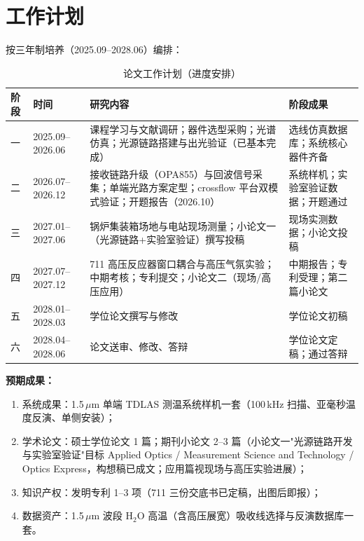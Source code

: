 \documentclass[12pt,a4paper]{article}
\begin{document}
\section{工作计划}

按三年制培养（2025.09--2028.06）编排：

\begin{table}[htbp]
  \centering
  \caption{论文工作计划（进度安排）}
  \begin{tabular}{p{1.0cm}p{2.9cm}p{5.2cm}p{4.2cm}}
    \toprule
    阶段 & 时间 & 研究内容 & 阶段成果 \\
    \midrule
    一 & 2025.09--2026.06 & 课程学习与文献调研；器件选型采购；光谱仿真；光源链路搭建与出光验证（已基本完成） & 选线仿真数据库；系统核心器件齐备 \\
    二 & 2026.07--2026.12 & 接收链路升级（OPA855）与回波信号采集；单端光路方案定型；crossflow 平台双模式验证；开题报告（2026.10） & 系统样机；实验室验证数据；开题通过 \\
    三 & 2027.01--2027.06 & 锅炉集装箱场地与电站现场测量；小论文一（光源链路+实验室验证）撰写投稿 & 现场实测数据；小论文投稿 \\
    四 & 2027.07--2027.12 & 711 高压反应器窗口耦合与高压气氛实验；中期考核；专利提交；小论文二（现场/高压应用） & 中期报告；专利受理；第二篇小论文 \\
    五 & 2028.01--2028.03 & 学位论文撰写与修改 & 学位论文初稿 \\
    六 & 2028.04--2028.06 & 论文送审、修改、答辩 & 学位论文定稿；通过答辩 \\
    \bottomrule
  \end{tabular}
\end{table}

\textbf{预期成果：}
\begin{enumerate}
  \item 系统成果：1.5\,$\mu$m 单端 TDLAS 测温系统样机一套（100\,kHz 扫描、亚毫秒温度反演、单侧安装）；
  \item 学术论文：硕士学位论文 1 篇；期刊小论文 2--3 篇（小论文一"光源链路开发与实验室验证"目标 Applied Optics / Measurement Science and Technology / Optics Express，构想稿已成文；应用篇视现场与高压实验进展）；
  \item 知识产权：发明专利 1--3 项（711 三份交底书已定稿，出图后即报）；
  \item 数据资产：1.5\,$\mu$m 波段 H$_2$O 高温（含高压展宽）吸收线选择与反演数据库一套。
\end{enumerate}

\end{document}
